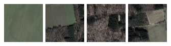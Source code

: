 \newcommand{\VegetationIndicesImageWidth}{0.18\textwidth}
\begin{figure}
    \centering

    \includegraphics[width=\VegetationIndicesImageWidth]{images/vegetation/original/1} \hfill
    \includegraphics[width=\VegetationIndicesImageWidth]{images/vegetation/original/2} \hfill
    \includegraphics[width=\VegetationIndicesImageWidth]{images/vegetation/original/3} \hfill
    \includegraphics[width=\VegetationIndicesImageWidth]{images/vegetation/original/4} \hfill

\end{figure}

